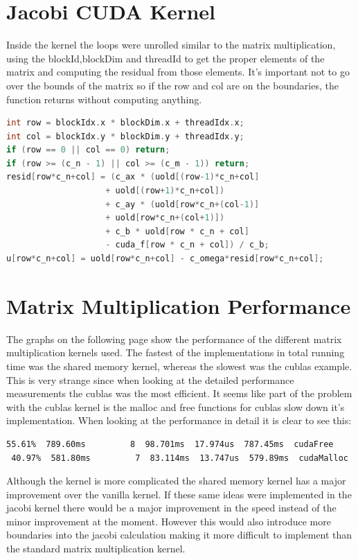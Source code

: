\documentclass[a4paper]{article}
\begin{document}
\section*{Jacobi CUDA Kernel}
Inside the kernel the loops were unrolled similar to the matrix multiplication, using the blockId,blockDim and threadId to get the proper elements of the matrix and computing the residual from those elements. It's important not to go over the bounds of the matrix so if the row and col are on the boundaries, the function returns without computing anything.
\begin{lstlisting}[language=C++]
int row = blockIdx.x * blockDim.x + threadIdx.x;
int col = blockIdx.y * blockDim.y + threadIdx.y;
if (row == 0 || col == 0) return;
if (row >= (c_n - 1) || col >= (c_m - 1)) return;
resid[row*c_n+col] = (c_ax * (uold[(row-1)*c_n+col]
  					+ uold[(row+1)*c_n+col])
  					+ c_ay * (uold[row*c_n+(col-1)]
  					+ uold[row*c_n+(col+1)])
  					+ c_b * uold[row * c_n + col] 
  					- cuda_f[row * c_n + col]) / c_b;
u[row*c_n+col] = uold[row*c_n+col] - c_omega*resid[row*c_n+col];
\end{lstlisting}

\section*{Matrix Multiplication Performance}
The graphs on the following page show the performance of the different matrix multiplication kernels used. The fastest of the implementations in total running time was the shared memory kernel, whereas the slowest was the cublas example. This is very strange since when looking at the detailed performance measurements the cublas was the most efficient. It seems like part of the problem with the cublas kernel is the malloc and free functions for cublas slow down it's implementation. When looking at the performance in detail it is clear to see this:
\begin{lstlisting}[language=bash]
 55.61%  789.60ms         8  98.701ms  17.974us  787.45ms  cudaFree
 40.97%  581.80ms         7  83.114ms  13.747us  579.89ms  cudaMalloc
 \end{lstlisting}

Although the kernel is more complicated the shared memory kernel has a major improvement over the vanilla kernel. If these same ideas were implemented in the jacobi kernel there would be a major improvement in the speed instead of the minor improvement at the moment. However this would also introduce more boundaries into the jacobi calculation making it more difficult to implement than the standard matrix multiplication kernel.
 
\end{document}
